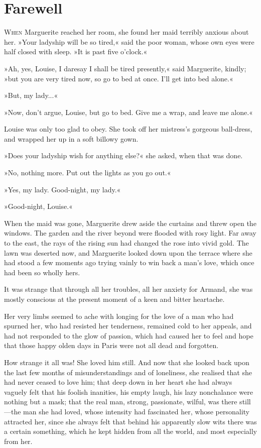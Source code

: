
\chapter{Farewell}
\lettrine[lines=4]{W}{hen} Marguerite reached her room, she found her maid terribly anxious about her. »Your ladyship will be so tired,« said the poor woman, whose own eyes were half closed with sleep. »It is past five o'clock.«

»Ah, yes, Louise, I daresay I shall be tired presently,« said Marguerite, kindly; »but you are very tired now, so go to bed at once. I'll get into bed alone.«

»But, my lady...«

»Now, don't argue, Louise, but go to bed. Give me a wrap, and leave me alone.«

Louise was only too glad to obey. She took off her mistress's gorgeous ball-dress, and wrapped her up in a soft billowy gown.

»Does your ladyship wish for anything else?« she asked, when that was done.

»No, nothing more. Put out the lights as you go out.«

»Yes, my lady. Good-night, my lady.«

»Good-night, Louise.«

When the maid was gone, Marguerite drew aside the curtains and threw open the windows. The garden and the river beyond were flooded with rosy light. Far away to the east, the rays of the rising sun had changed the rose into vivid gold. The lawn was deserted now, and Marguerite looked down upon the terrace where she had stood a few moments ago trying vainly to win back a man's love, which once had been so wholly hers.

It was strange that through all her troubles, all her anxiety for Armand, she was mostly conscious at the present moment of a keen and bitter heartache.

Her very limbs seemed to ache with longing for the love of a man who had spurned her, who had resisted her tenderness, remained cold to her appeals, and had not responded to the glow of passion, which had caused her to feel and hope that those happy olden days in Paris were not all dead and forgotten.

How strange it all was! She loved him still. And now that she looked back upon the last few months of misunderstandings and of loneliness, she realised that she had never ceased to love him; that deep down in her heart she had always vaguely felt that his foolish inanities, his empty laugh, his lazy nonchalance were nothing but a mask; that the real man, strong, passionate, wilful, was there still\allowbreak---\allowbreak the man she had loved, whose intensity had fascinated her, whose personality attracted her, since she always felt that behind his apparently slow wits there was a certain something, which he kept hidden from all the world, and most especially from her.

